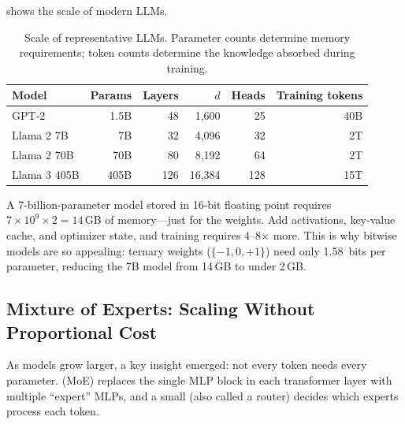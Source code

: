  shows the scale of modern LLMs.

\begin{table}[htbp]
\centering
\caption{Scale of representative LLMs. Parameter counts determine
  memory requirements; token counts determine the knowledge absorbed
  during training.}
\label{tab:llm-sizes}
\begin{tabular}{@{}lrrrrr@{}}
  \toprule
  \textbf{Model} & \textbf{Params} & \textbf{Layers} & \textbf{$d$}
    & \textbf{Heads} & \textbf{Training tokens} \\
  \midrule
  GPT-2       & 1.5B    & 48  & 1{,}600  & 25  & 40B \\
  Llama 2 7B  & 7B      & 32  & 4{,}096  & 32  & 2T \\
  Llama 2 70B & 70B     & 80  & 8{,}192  & 64  & 2T \\
  Llama 3 405B& 405B    & 126 & 16{,}384 & 128 & 15T \\
  \bottomrule
\end{tabular}
\end{table}

\begin{engineernote}
A 7-billion-parameter model stored in 16-bit floating point requires
$7 \times 10^9 \times 2 = 14$\,GB of memory---just for the weights.
Add activations, key-value cache, and optimizer state, and training
requires 4--8$\times$ more. This is why bitwise models are so
appealing: ternary weights ($\{-1, 0, +1\}$) need only 1.58~bits
per parameter, reducing the 7B model from 14\,GB to under 2\,GB.
\end{engineernote}

\subsection{Mixture of Experts: Scaling Without Proportional Cost}
\label{sec:moe}

As models grow larger, a key insight emerged: not every token needs
every parameter.  (MoE) replaces the
single MLP block in each transformer layer with multiple ``expert''
MLPs, and a small  (also called a router)
decides which experts process each token.


